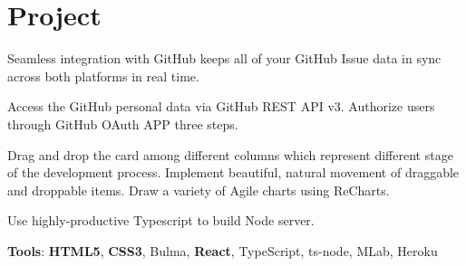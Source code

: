 \documentclass[letterpaper]{deedy-resume} %
\begin{document}
\begin{minipage}[t]{0.66\textwidth}
\begin{tightitemize}
\end{tightitemize}
\sectionspace
\section{Project}

\vspace{\topsep} %
\begin{tightitemize}
	\item Seamless integration with GitHub keeps all of your GitHub Issue data in sync across both platforms in real time.
	\item Access the GitHub personal data via GitHub REST API v3. Authorize users through GitHub OAuth APP three steps.
	\item Drag and drop the card among different columns which represent different stage of the development process. Implement beautiful, natural movement of draggable and droppable items. Draw a variety of Agile charts using ReCharts.
	\item Use highly-productive Typescript to build Node server.
	\item \textbf{Tools}: \textbf{HTML5}, \textbf{CSS3}, Bulma, \textbf{React}, TypeScript, ts-node, MLab, Heroku
\end{tightitemize}





\sectionspace %
\vspace{\topsep} %






\end{minipage}
\end{document}
